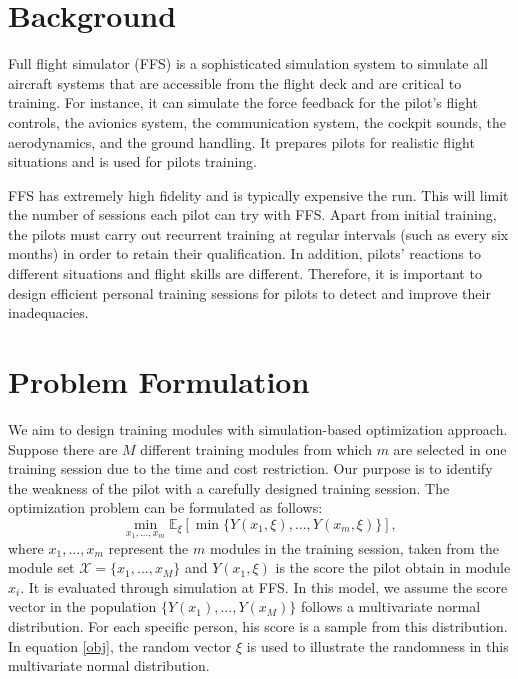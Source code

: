 \documentclass[opre,sglanonrev]{informs4}
\begin{document}


\maketitle


\section{Background}
Full flight simulator (FFS) is a sophisticated simulation system to simulate all aircraft systems that are accessible from the flight deck and are critical to training. For instance, it can simulate the force feedback for the pilot's flight controls, the avionics system, the communication system, the cockpit sounds, the aerodynamics, and the ground handling. It prepares pilots for realistic flight situations and is used for pilots training.

FFS has extremely high fidelity and is typically expensive the run. This will limit the number of sessions each pilot can try with FFS. Apart from initial training, the pilots must carry out recurrent training at regular intervals (such as every six months) in order to retain their qualification. In addition, pilots’ reactions to different situations and flight skills are different. Therefore, it is important to design efficient personal training sessions for pilots to detect and improve their inadequacies.

\section{Problem Formulation}
We aim to design training modules with simulation-based optimization approach. Suppose there are $M$ different training modules from which $m$ are selected in one training session due to the time and cost restriction. Our purpose is to identify the weakness of the pilot with a carefully designed training session. The optimization problem can be formulated as follows:
\begin{equation}
	\min_{x_1,...,x_m} \mathbb{E}_\xi[\min\{Y(x_1,\xi),...,Y(x_m,\xi) \} ], 
	\label{obj}
\end{equation}
where $x_1,...,x_m$ represent the $m$ modules in the training session, taken from the module set $\mathcal{X} = \{x_1,...,x_M\}$ and $Y(x_1,\xi)$ is the score the pilot obtain in module $x_i$. It is evaluated through simulation at FFS. In this model, we assume the score vector in the population $\{Y(x_1),...,Y(x_M)\}$ follows a multivariate normal distribution. For each specific person, his score is a sample from this distribution. In equation \eqref{obj}, the random vector $\xi$ is used to illustrate the randomness in this multivariate normal distribution. 
\end{document}
